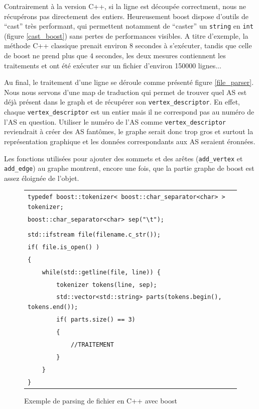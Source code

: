 Contrairement à la version C++, si la ligne est découpée correctment, nous ne récupérons pas directement des entiers. Heureusement boost dispose d'outils de ``cast'' très performant, qui permettent notamment de ``caster'' un \verb|string| en \verb|int| (figure \ref{cast_boost}) sans pertes de performances visibles. A titre d'exemple, la méthode C++ classique prenait environ 8 secondes à s'exécuter, tandis que celle de boost ne prend plus que 4 secondes, les deux mesures contiennent les traitements et ont été exécuter sur un fichier d'environ 150000 lignes...

Au final, le traitement d'une ligne se déroule comme présenté figure \ref{file_parser}. Nous nous servons d'une map de traduction qui permet de trouver quel AS est déjà présent dans le graph et de récupérer son \verb|vertex_descriptor|. En effet, chaque \verb|vertex_descriptor| est un entier mais il ne correspond pas au numéro de l'AS en question. Utiliser le numéro de l'AS comme \verb|vertex_descriptor| reviendrait à créer des AS fantômes, le graphe serait donc trop gros et surtout la représentation graphique et les données correspondants aux AS seraient éronnées.

Les fonctions utilisées pour ajouter des sommets et des arêtes (\verb|add_vertex| et \verb|add_edge|) au graphe montrent, encore une fois, que la partie graphe de boost est assez éloignée de l'objet.

\begin{figure}[H]
   \begin{center}
      \begin{tabular}{l}
        \hline 
 	\verb|typedef boost::tokenizer< boost::char_separator<char> > tokenizer;|\\
 	\verb|boost::char_separator<char> sep("\t");|\\
	\verb||\\
	\verb|std::ifstream file(filename.c_str());|\\
	\verb|if( file.is_open() )|\\
	\verb|{|\\
	\verb|    while(std::getline(file, line)) {|\\
	\verb|        tokenizer tokens(line, sep);|\\
	\verb|        std::vector<std::string> parts(tokens.begin(), tokens.end());|\\
	\verb|        if( parts.size() == 3)|\\
	\verb|        {|\\
	\verb|            //TRAITEMENT|\\
	\verb|        }|\\
	\verb|    }|\\
	\verb|}|\\
        \hline
      \end{tabular}
   \end{center}
\caption{\label{parse_boost} Exemple de parsing de fichier en C++ avec boost}
\end{figure}
 

